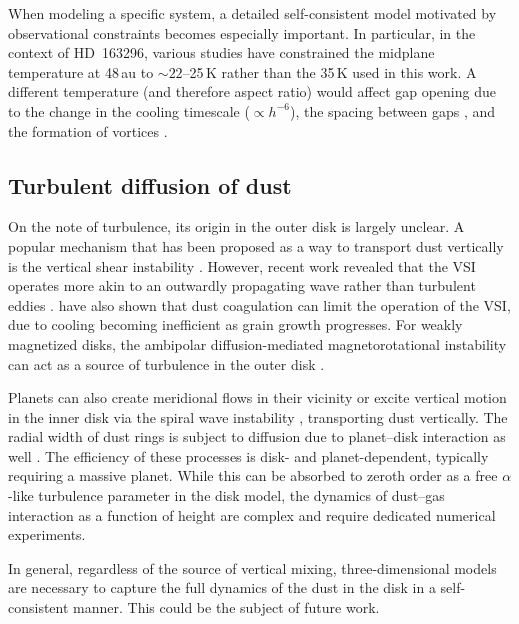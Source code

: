 \documentclass[fleqn,usenatbib,useAMS]{mnras}
\begin{document}
When modeling a specific system, a detailed self-consistent model motivated by observational constraints becomes especially important. In particular, in the context of HD~163296, various studies have constrained the midplane temperature at 48\,au to $\sim22$--25\,K \citep{flaherty-etal-2015,dullemond-etal-2020,law-etal-2021} rather than the 35\,K used in this work. A different temperature (and therefore aspect ratio) would affect gap opening due to the change in the cooling timescale ($\propto h^{-6}$), the spacing between gaps \citep{zhang-etal-2018}, and the formation of vortices \citep{chang-etal-2023}.

\subsection{Turbulent diffusion of dust}

On the note of turbulence, its origin in the outer disk is largely unclear. A popular mechanism that has been proposed as a way to transport dust vertically is the vertical shear instability \citep[VSI,][]{nelson-etal-2013}. However, recent work revealed that the VSI operates more akin to an outwardly propagating wave rather than turbulent eddies \citep{svanberg-etal-2022}. \citet{pfeil-etal-2023} have also shown that dust coagulation can limit the operation of the VSI, due to cooling becoming inefficient as grain growth progresses. For weakly magnetized disks, the ambipolar diffusion-mediated magnetorotational instability can act as a source of turbulence in the outer disk \citep[e.g.,][]{simon-etal-2013}.

Planets can also create meridional flows in their vicinity \citep[e.g.,][]{fung-etal-2019,bi-etal-2021,binkert-etal-2023} or excite vertical motion in the inner disk via the spiral wave instability \citep[SWI,][]{bae-etal-2016a,bae-etal-2016b}, transporting dust vertically. The radial width of dust rings is subject to diffusion due to planet--disk interaction as well \citep{bi-etal-2023}. The efficiency of these processes is disk- and planet-dependent, typically requiring a massive planet. While this can be absorbed to zeroth order as a free $\alpha$-like turbulence parameter in the disk model, the dynamics of dust--gas interaction as a function of height are complex and require dedicated numerical experiments.

In general, regardless of the source of vertical mixing, three-dimensional models are necessary to capture the full dynamics of the dust in the disk in a self-consistent manner. This could be the subject of future work.
\end{document}
